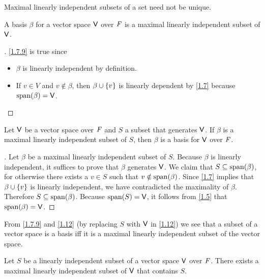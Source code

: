 \begin{note}
  Maximal linearly independent subsets of a set need not be unique.
\end{note}

\begin{eg}\label{1.7.9}
  A basis \(\beta\) for a vector space \(\mathsf{V}\) over \(\mathit{F}\) is a maximal linearly independent subset of \(\mathsf{V}\).
\end{eg}

\begin{proof}[]
  \cref{1.7.9} is true since
  \begin{itemize}
    \item \(\beta\) is linearly independent by definition.
    \item If \(v \in V\) and \(v \notin \beta\), then \(\beta \cup \left\lbrace v\right\rbrace\) is linearly dependent by \cref{1.7} because \(\spn{\beta} = \V\).
  \end{itemize}
\end{proof}

\begin{thm}\label{1.12}
  Let \(\mathsf{V}\) be a vector space over \(\mathit{F}\) and \(S\) a subset that generates \(\mathsf{V}\).
  If \(\beta\) is a maximal linearly independent subset of \(S\), then \(\beta\) is a basis for \(\mathsf{V}\) over \(\mathit{F}\).
\end{thm}

\begin{proof}[]
  Let \(\beta\) be a maximal linearly independent subset of \(S\).
  Because \(\beta\) is linearly independent, it suffices to prove that \(\beta\) generates \(\mathsf{V}\).
  We claim that \(S \subseteq \spn{\beta}\), for otherwise there exists a \(v \in S\) such that \(v \notin \spn{\beta}\).
  Since \cref{1.7} implies that \(\beta \cup \left\lbrace v\right\rbrace\) is linearly independent, we have contradicted the maximality of \(\beta\).
  Therefore \(S \subseteq \spn{\beta}\).
  Because \(\spn{S} = \V\), it follows from \cref{1.5} that \(\spn{\beta} = \V\).
\end{proof}

\begin{note}
  From \cref{1.7.9} and \cref{1.12} (by replacing \(S\) with \(\mathsf{V}\) in \cref{1.12}) we see that a subset of a vector space is a basis iff it is a maximal linearly independent subset of the vector space.
\end{note}

\begin{thm}\label{1.13}
  Let \(S\) be a linearly independent subset of a vector space \(\mathsf{V}\) over \(\mathit{F}\).
  There exists a maximal linearly independent subset of \(\mathsf{V}\) that contains \(S\).
\end{thm}

